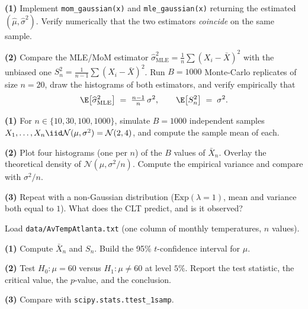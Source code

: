 \documentclass[a4paper,11pt]{article}
\begin{document}
\begin{exercise}
\textbf{(1)} Implement \texttt{mom\_gaussian(x)} and
\texttt{mle\_gaussian(x)} returning the estimated $(\widehat\mu,
\widehat\sigma^2)$. Verify numerically that the two estimators
\emph{coincide} on the same sample.

\textbf{(2)} Compare the MLE/MoM estimator $\widehat\sigma^2_{\text{MLE}}
= \tfrac{1}{n}\sum (X_i - \bar X)^2$ with the unbiased one
$S^2_n = \tfrac{1}{n-1}\sum (X_i - \bar X)^2$. Run $B = 1000$ Monte-Carlo
replicates of size $n = 20$, draw the histograms of both estimators,
and verify empirically that
\[
  \E\bigl[\widehat\sigma^2_{\text{MLE}}\bigr] \;=\; \tfrac{n-1}{n}\,\sigma^2,
  \qquad
  \E\bigl[S^2_n\bigr] \;=\; \sigma^2.
\]
\end{exercise}

\begin{exercise}
\textbf{(1)} For $n \in \{10, 30, 100, 1000\}$, simulate
$B = 1000$ independent samples $X_1, \dots, X_n \iid
\mathcal{N}(\mu, \sigma^2) = \mathcal{N}(2, 4)$, and compute the
sample mean of each.

\textbf{(2)} Plot four histograms (one per $n$) of the $B$ values of
$\bar X_n$. Overlay the theoretical density of
$\mathcal{N}(\mu, \sigma^2/n)$. Compute the empirical variance and
compare with $\sigma^2 / n$.

\textbf{(3)} Repeat with a non-Gaussian distribution
($\mathrm{Exp}(\lambda = 1)$, mean and variance both equal to $1$).
What does the CLT predict, and is it observed?
\end{exercise}

\begin{exercise}
Load \texttt{data/AvTempAtlanta.txt} (one column of monthly
temperatures, $n$ values).

\textbf{(1)} Compute $\bar X_n$ and $S_n$. Build the 95\% $t$-confidence
interval for $\mu$.

\textbf{(2)} Test $H_0 : \mu = 60$ versus $H_1 : \mu \neq 60$ at level
$5\%$. Report the test statistic, the critical value, the $p$-value,
and the conclusion.

\textbf{(3)} Compare with \texttt{scipy.stats.ttest\_1samp}.
\end{exercise}
\end{document}
